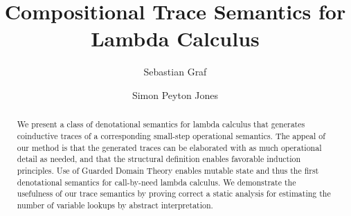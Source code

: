 \documentclass[acmsmall,review]{acmart}\settopmatter{printfolios=true,printccs=false,printacmref=false}
\newif\ifmain
\begin{document}
\setlength{\pdfpageheight}{\paperheight}
\setlength{\pdfpagewidth}{\paperwidth}

\title{Compositional Trace Semantics for Lambda Calculus}

\author{Sebastian Graf}

\author{Simon Peyton Jones}

\ifmain

\begin{abstract}
  We present a class of denotational semantics for lambda calculus that
  generates coinductive traces of a corresponding small-step operational
  semantics.
  The appeal of our method is that the generated traces can be elaborated with
  as much operational detail as needed, and that the structural definition
  enables favorable induction principles.
  Use of Guarded Domain Theory enables mutable state and thus the first
  denotational semantics for call-by-need lambda calculus.
  We demonstrate the usefulness of our trace semantics by proving correct a
  static analysis for estimating the number of variable lookups by abstract
  interpretation.
\end{abstract}
\end{document}
